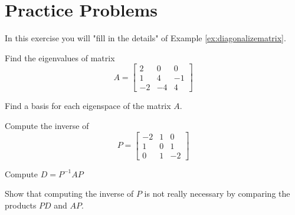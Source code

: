 \documentclass{ximera}
\begin{document}
\section*{Practice Problems}
\begin{problem}
In this exercise you will "fill in the details" of Example \ref{ex:diagonalizematrix}.
\begin{problem}\label{prob:ex:diagonalizematrix1}
Find the eigenvalues of matrix 
\begin{equation*}
A=\begin{bmatrix}
2 & 0 & 0 \\
1 & 4 & -1 \\
-2 & -4 & 4
\end{bmatrix}
\end{equation*}
\end{problem} 
\begin{problem}\label{prob:ex:diagonalizematrix2}
Find a basis for each eigenspace of the matrix $A$.
\end{problem}
\begin{problem}\label{prob:ex:diagonalizematrix3}
Compute the inverse of \begin{equation*}
P=
\begin{bmatrix}
-2 & 1 & 0 \\
1 & 0 & 1 \\
0 & 1 & -2
\end{bmatrix}
\end{equation*}
\end{problem}
\begin{problem}\label{prob:ex:diagonalizematrix5}
Compute $D=P^{-1}AP$
\end{problem}
\begin{problem}\label{prob:ex:diagonalizematrix4}
Show that computing the inverse of $P$ is not really necessary by comparing the products  $PD$ and $AP$.
\end{problem}
  \end{problem}
\end{document}

